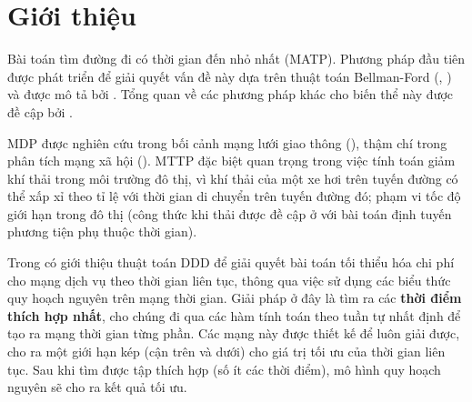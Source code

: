 \documentclass[../main.tex]{subfiles}
\begin{document}
\chapter{Giới thiệu}\label{introduce}


Bài toán tìm đường đi có thời gian đến nhỏ nhất (MATP). Phương pháp đầu
tiên được phát triển để giải quyết vấn đề này dựa trên thuật toán
Bellman-Ford (\cite{bellman1958routing}, \cite{ford2010flows}) và được mô tả bởi
\cite{cooke1966shortest}. Tổng quan về các phương pháp khác cho biến thể
này được đề cập bởi \cite{dean2004shortest}.

MDP được nghiên cứu trong bối cảnh mạng lưới giao thông (\cite{demiryurek2011online}), thậm chí trong phân tích mạng xã hội (\cite{gunturi2012information}).
MTTP đặc biệt quan trọng trong việc tính toán giảm khí thải trong môi
trường đô thị, vì khí thải của một xe hơi trên tuyến đường có thể xấp xỉ
theo tỉ lệ với thời gian di chuyển trên tuyến đường đó; phạm vi tốc độ
giới hạn trong đô thị (công thức khi thải được đề cập ở \cite{jabali2012analysis} với bài toán định tuyến phương tiện phụ thuộc thời gian).

Trong \cite{boland2017continuous} có giới thiệu thuật toán DDD để giải quyết bài
toán tối thiểu hóa chi phí cho mạng dịch vụ theo thời gian liên tục,
thông qua việc sử dụng các biểu thức quy hoạch nguyên trên mạng thời
gian. Giải pháp ở đây là tìm ra các \textbf{thời điểm thích hợp nhất},
cho chúng đi qua các hàm tính toán theo tuần tự nhất định để tạo ra mạng
thời gian từng phần. Các mạng này được thiết kế để luôn giải được, cho
ra một giới hạn kép (cận trên và dưới) cho giá trị tối ưu của thời gian
liên tục. Sau khi tìm được tập thích hợp (số ít các thời điểm), mô hình
quy hoạch nguyên sẽ cho ra kết quả tối ưu.


\end{document}
